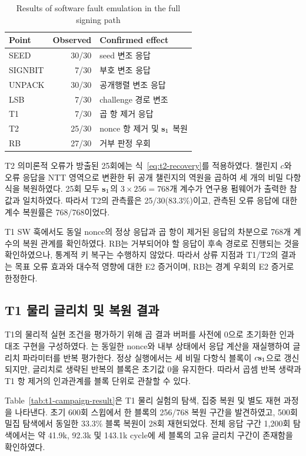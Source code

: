 \begin{table}[H]
\centering
\caption{Results of software fault emulation in the full signing path}
\label{tab:sw-fault-result}
\footnotesize
\begin{tabularx}{\columnwidth}{@{}l r X@{}}
\toprule
Point & Observed & Confirmed effect \\
\midrule
SEED    & 30/30 & seed 변조 응답 \\
SIGNBIT & 7/30  & 부호 변조 응답 \\
UNPACK  & 30/30 & 공개행렬 변조 응답 \\
LSB     & 7/30  & challenge 경로 변조 \\
T1      & 7/30  & 곱 항 제거 응답 \\
T2      & 25/30 & nonce 항 제거 및 $\mathbf{s}_1$ 복원 \\
RB      & 27/30 & 거부 판정 우회 \\
\bottomrule
\end{tabularx}
\end{table}

T2 의미론적 오류가 방출된 25회에는 식~\eqref{eq:t2-recovery}를
적용하였다. 챌린지 $c$와 오류 응답을 NTT 영역으로 변환한 뒤 공개
챌린지의 역원을 곱하여 세 개의 비밀 다항식을 복원하였다. 25회 모두
$\mathbf{s}_1$의 $3\times256=768$개 계수가 연구용 펌웨어가 출력한 참
값과 일치하였다. 따라서 T2의 관측률은 25/30(83.3\%)이고, 관측된
오류 응답에 대한 계수 복원률은 768/768이었다.

T1 SW 훅에서도 동일 nonce의 정상 응답과 곱 항이 제거된 응답의
차분으로 768개 계수의 복원 관계를 확인하였다. RB는 거부되어야 할
응답이 후속 경로로 진행되는 것을 확인하였으나, 통계적 키 복구는
수행하지 않았다. 따라서 상류 지점과 T1/T2의 결과는 목표 오류 효과와
대수적 영향에 대한 E2 증거이며, RB는 경계 우회의 E2 증거로 한정한다.

\subsection{T1 물리 글리치 및 복원 결과}
\label{subsec:physical-t1}

T1의 물리적 실현 조건을 평가하기 위해 곱 결과 버퍼를 사전에 0으로
초기화한  인과대조 구현을 구성하였다.
는 동일한 nonce와 내부 상태에서 응답 계산을
재실행하여 글리치 파라미터를 반복 평가한다. 정상 실행에서는 세 비밀
다항식 블록이 $c\mathbf{s}_1$으로 갱신되지만, 글리치로 생략된 반복의
블록은 초기값 0을 유지한다. 따라서 곱셈 반복 생략과 T1 항 제거의
인과관계를 블록 단위로 관찰할 수 있다.

Table~\ref{tab:t1-campaign-result}은 T1 물리 실험의 탐색, 집중 복원
및 별도 재현 과정을 나타낸다. 초기 600회 스윕에서 한 블록의
256/768 복원 구간을 발견하였고, 500회 밀집 탐색에서 동일한
33.3\% 블록 복원이 28회 재현되었다. 전체 응답 구간 1,200회
탐색에서는 약 41.9k, 92.3k 및 143.1k cycle에 세 블록의 고유
글리치 구간이 존재함을 확인하였다.

